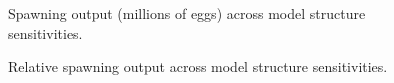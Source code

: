 \documentclass[
]{scrartcl}
\begin{document}
\begin{figure}


\caption{\label{fig-sens_model_spout}Spawning output (millions of eggs)
across model structure sensitivities.}

\end{figure}%

\begin{figure}


\caption{\label{fig-sens_model_status}Relative spawning output across
model structure sensitivities.}

\end{figure}%
\end{document}
